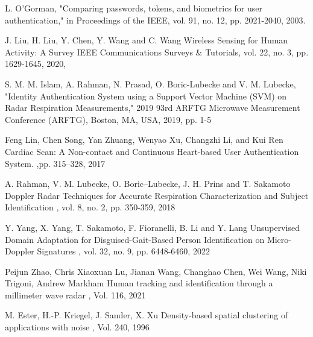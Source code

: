 \begin{bib}[100]

  L. O'Gorman, "Comparing passwords, tokens, and biometrics for user authentication," in Proceedings of the IEEE, vol. 91, no. 12, pp. 2021-2040, 2003.

  J. Liu, H. Liu, Y. Chen, Y. Wang and C. Wang
  \newblock Wireless Sensing for Human Activity: A Survey
  \newblock IEEE Communications Surveys \& Tutorials, vol. 22, no. 3, pp. 1629-1645, 2020,

  S. M. M. Islam, A. Rahman, N. Prasad, O. Boric-Lubecke and V. M. Lubecke, "Identity Authentication System using a Support Vector Machine (SVM) on Radar Respiration Measurements," 2019 93rd ARFTG Microwave Measurement Conference (ARFTG), Boston, MA, USA, 2019, pp. 1-5

  Feng Lin, Chen Song, Yan Zhuang, Wenyao Xu, Changzhi Li, and Kui Ren
  \newblock Cardiac Scan: A Non-contact and Continuous Heart-based User Authentication System. 
   ,pp. 315–328, 2017

  A. Rahman, V. M. Lubecke, O. Boric–Lubecke, J. H. Prins and T. Sakamoto
  \newblock Doppler Radar Techniques for Accurate Respiration Characterization and Subject Identification
  , vol. 8, no. 2, pp. 350-359, 2018


  Y. Yang, X. Yang, T. Sakamoto, F. Fioranelli, B. Li and Y. Lang
  \newblock Unsupervised Domain Adaptation for Disguised-Gait-Based Person Identification on Micro-Doppler Signatures
  , vol. 32, no. 9, pp. 6448-6460, 2022

  Peijun Zhao, Chris Xiaoxuan Lu, Jianan Wang, Changhao Chen, Wei Wang, Niki Trigoni, Andrew Markham
  \newblock Human tracking and identification through a millimeter wave radar
  , Vol. 116, 2021

  M. Ester, H.-P. Kriegel, J. Sander, X. Xu
  \newblock Density-based spatial clustering of applications with noise
  , Vol. 240, 1996


\end{bib}
